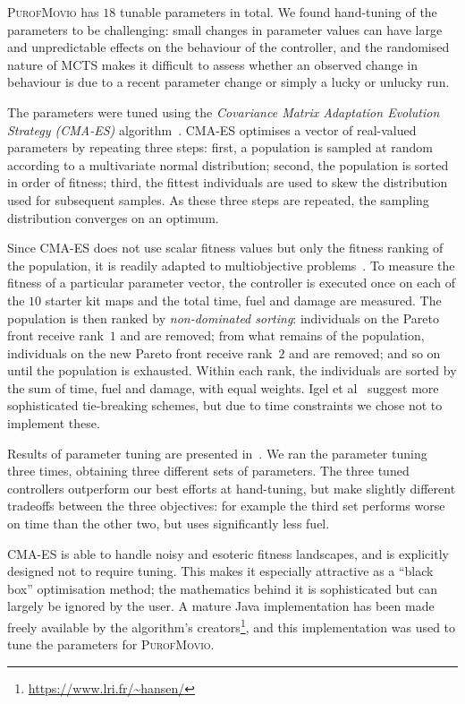 \documentclass[conference]{IEEEtran}
\begin{document}
\textsc{PurofMovio} has $18$ tunable parameters in total.
We found hand-tuning of the parameters to be challenging:
small changes in parameter values can have large and unpredictable effects on the behaviour of the controller,
and the randomised nature of MCTS makes it difficult to assess whether an observed change in behaviour is due to a recent parameter change
or simply a lucky or unlucky run.

The parameters were tuned using the \emph{Covariance Matrix Adaptation Evolution Strategy (CMA-ES)} algorithm~\cite{Hansen2001}.
CMA-ES optimises a vector of real-valued parameters by repeating three steps:
first, a population is sampled at random according to a multivariate normal distribution;
second, the population is sorted in order of fitness;
third, the fittest individuals are used to skew the distribution used for subsequent samples.
As these three steps are repeated, the sampling distribution converges on an optimum.

Since CMA-ES does not use scalar fitness values but only the fitness ranking of the population,
it is readily adapted to multiobjective problems~\cite{Igel2007}.
To measure the fitness of a particular parameter vector,
the controller is executed once on each of the $10$ starter kit maps and the total time, fuel and damage are measured.
The population is then ranked by \emph{non-dominated sorting}:
individuals on the Pareto front receive rank~$1$ and are removed;
from what remains of the population, individuals on the new Pareto front receive rank~$2$ and are removed;
and so on until the population is exhausted.
Within each rank, the individuals are sorted by the sum of time, fuel and damage, with equal weights.
Igel et al~\cite{Igel2007} suggest more sophisticated tie-breaking schemes, but due to time constraints we chose not to implement these.

Results of parameter tuning are presented in~\cite{Powley2013_moptsp}.
We ran the parameter tuning three times, obtaining three different sets of parameters.
The three tuned controllers outperform our best efforts at hand-tuning,
but make slightly different tradeoffs between the three objectives:
for example the third set performs worse on time than the other two, but uses significantly less fuel.

CMA-ES is able to handle noisy and esoteric fitness landscapes, and is explicitly designed not to require tuning.
This makes it especially attractive as a ``black box'' optimisation method;
the mathematics behind it is sophisticated but can largely be ignored by the user.
A mature Java implementation has been made freely available by the algorithm's creators\footnote{\url{https://www.lri.fr/~hansen/}},
and this implementation was used to tune the parameters for \textsc{PurofMovio}.
\end{document}
